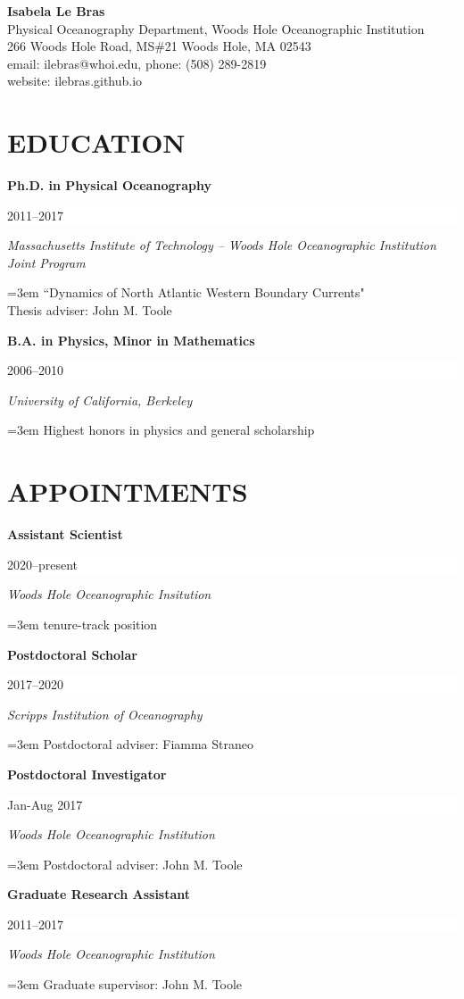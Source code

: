 \documentclass[paper=letter,fontsize=11pt]{scrartcl} %
\newcommand{\sepspace}{\vspace*{3mm}}		%
\newcommand{\NewPart}[2]{\section*{\uppercase{#1} #2}}
\newcommand{\EducationEntry}[4]{
		\noindent \textbf{#1} \hfill      %
		\colorbox{White}{%
			\parbox{8em}{%
			\hfill\color{Black}#2}} \par  %
		\noindent \textit{#3} \par        %
		\noindent\hangindent=3em\hangafter=0 #4 %
		 \par}
\begin{document}


\begin{center}
\Large{\textbf{Isabela Le Bras}}\\
\normalsize{
Physical Oceanography Department, Woods Hole Oceanographic Institution\\
266 Woods Hole Road, MS\#21 Woods Hole, MA 02543\\
email: ilebras@whoi.edu, phone: (508) 289-2819\\
website: ilebras.github.io
}
\end{center}


\NewPart{Education}{}

\EducationEntry{Ph.D. in Physical Oceanography}{2011--2017}{Massachusetts Institute of Technology -- Woods Hole Oceanographic Institution Joint Program}{``Dynamics of North Atlantic Western Boundary Currents"\\
Thesis adviser: John M. Toole}
\sepspace

\EducationEntry{B.A. in Physics, Minor in Mathematics}{2006--2010}{University of California, Berkeley}{Highest honors in physics and general scholarship}

\NewPart{Appointments}{}

\EducationEntry{{Assistant Scientist}}{2020--present}{Woods Hole Oceanographic Insitution}{tenure-track position}

\sepspace

\EducationEntry{{Postdoctoral Scholar}}{2017--2020}{Scripps Institution of Oceanography}{Postdoctoral adviser: Fiamma Straneo}

\sepspace

\EducationEntry{Postdoctoral Investigator}{Jan-Aug 2017}{Woods Hole Oceanographic Institution}
{Postdoctoral adviser: John M. Toole}

\sepspace

\EducationEntry{Graduate Research Assistant}{2011--2017}{Woods Hole Oceanographic Institution}
{Graduate supervisor: John M. Toole}

\end{document}
